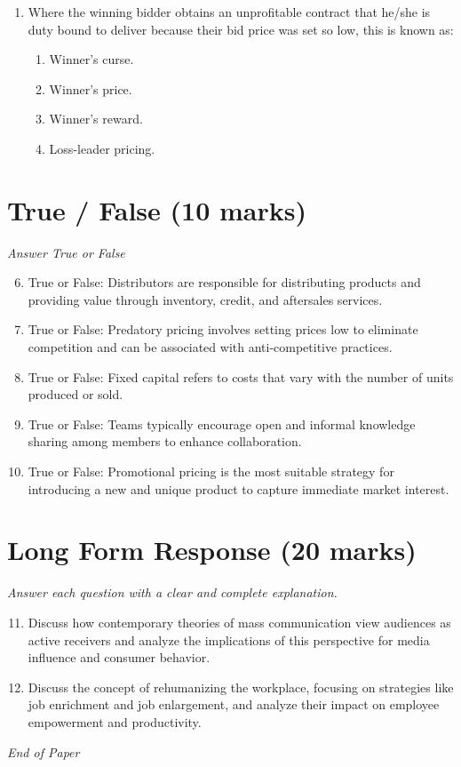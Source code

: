 \documentclass[12pt]{article}
\begin{document}
\begin{enumerate}[label=\arabic*.]
\begin{enumerate}[label=(\alph*)]
    \item Shaper
    \item Resource investigator
    \item Implementer
\end{enumerate}
\item Where the winning bidder obtains an unprofitable contract that he/she is duty bound to deliver because their bid price was set so low, this is known as:
\begin{enumerate}[label=(\alph*)]
    \item Winner's curse.
    \item Winner's price.
    \item Winner's reward.
    \item Loss-leader pricing.
\end{enumerate}
\end{enumerate}

\section*{True / False (10 marks)}
\textit{Answer True or False}
\begin{enumerate}[label=\arabic*.]
\setcounter{enumi}{5}
\item True or False: Distributors are responsible for distributing products and providing value through inventory, credit, and aftersales services.
\item True or False: Predatory pricing involves setting prices low to eliminate competition and can be associated with anti-competitive practices.
\item True or False: Fixed capital refers to costs that vary with the number of units produced or sold.
\item True or False: Teams typically encourage open and informal knowledge sharing among members to enhance collaboration.
\item True or False: Promotional pricing is the most suitable strategy for introducing a new and unique product to capture immediate market interest.
\end{enumerate}

\section*{Long Form Response (20 marks)}
\textit{Answer each question with a clear and complete explanation.}
\begin{enumerate}[label=\arabic*.]
\setcounter{enumi}{10}
\item Discuss how contemporary theories of mass communication view audiences as active receivers and analyze the implications of this perspective for media influence and consumer behavior.
\item Discuss the concept of rehumanizing the workplace, focusing on strategies like job enrichment and job enlargement, and analyze their impact on employee empowerment and productivity.
\end{enumerate}

\vfill
\noindent\textit{End of Paper}
\end{document}
